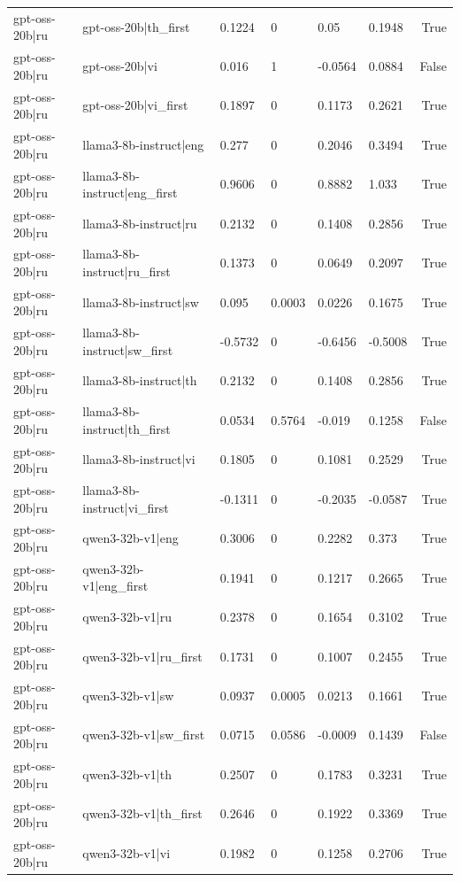 \begin{table}
\begin{tabular}{llllllr}
gpt-oss-20b|ru & gpt-oss-20b|th_first & 0.1224 & 0 & 0.05 & 0.1948 & True \\
gpt-oss-20b|ru & gpt-oss-20b|vi & 0.016 & 1 & -0.0564 & 0.0884 & False \\
gpt-oss-20b|ru & gpt-oss-20b|vi_first & 0.1897 & 0 & 0.1173 & 0.2621 & True \\
gpt-oss-20b|ru & llama3-8b-instruct|eng & 0.277 & 0 & 0.2046 & 0.3494 & True \\
gpt-oss-20b|ru & llama3-8b-instruct|eng_first & 0.9606 & 0 & 0.8882 & 1.033 & True \\
gpt-oss-20b|ru & llama3-8b-instruct|ru & 0.2132 & 0 & 0.1408 & 0.2856 & True \\
gpt-oss-20b|ru & llama3-8b-instruct|ru_first & 0.1373 & 0 & 0.0649 & 0.2097 & True \\
gpt-oss-20b|ru & llama3-8b-instruct|sw & 0.095 & 0.0003 & 0.0226 & 0.1675 & True \\
gpt-oss-20b|ru & llama3-8b-instruct|sw_first & -0.5732 & 0 & -0.6456 & -0.5008 & True \\
gpt-oss-20b|ru & llama3-8b-instruct|th & 0.2132 & 0 & 0.1408 & 0.2856 & True \\
gpt-oss-20b|ru & llama3-8b-instruct|th_first & 0.0534 & 0.5764 & -0.019 & 0.1258 & False \\
gpt-oss-20b|ru & llama3-8b-instruct|vi & 0.1805 & 0 & 0.1081 & 0.2529 & True \\
gpt-oss-20b|ru & llama3-8b-instruct|vi_first & -0.1311 & 0 & -0.2035 & -0.0587 & True \\
gpt-oss-20b|ru & qwen3-32b-v1|eng & 0.3006 & 0 & 0.2282 & 0.373 & True \\
gpt-oss-20b|ru & qwen3-32b-v1|eng_first & 0.1941 & 0 & 0.1217 & 0.2665 & True \\
gpt-oss-20b|ru & qwen3-32b-v1|ru & 0.2378 & 0 & 0.1654 & 0.3102 & True \\
gpt-oss-20b|ru & qwen3-32b-v1|ru_first & 0.1731 & 0 & 0.1007 & 0.2455 & True \\
gpt-oss-20b|ru & qwen3-32b-v1|sw & 0.0937 & 0.0005 & 0.0213 & 0.1661 & True \\
gpt-oss-20b|ru & qwen3-32b-v1|sw_first & 0.0715 & 0.0586 & -0.0009 & 0.1439 & False \\
gpt-oss-20b|ru & qwen3-32b-v1|th & 0.2507 & 0 & 0.1783 & 0.3231 & True \\
gpt-oss-20b|ru & qwen3-32b-v1|th_first & 0.2646 & 0 & 0.1922 & 0.3369 & True \\
gpt-oss-20b|ru & qwen3-32b-v1|vi & 0.1982 & 0 & 0.1258 & 0.2706 & True \\

\end{tabular}
\end{table}
